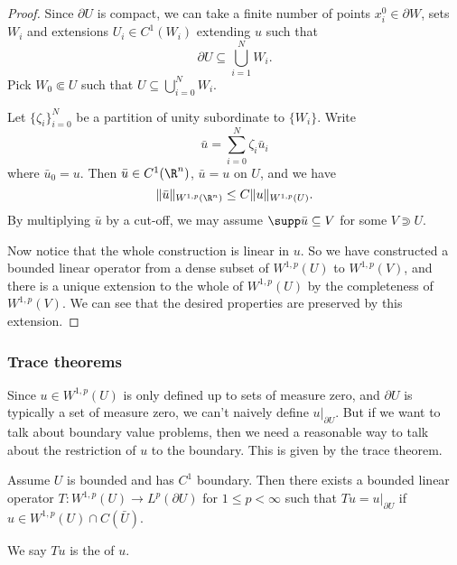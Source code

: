 \documentclass[a4paper]{article}
\begin{document}
\begin{proof}
  Since $\partial U$ is compact, we can take a finite number of points $x_i^0 \in \partial W$, sets $W_i$ and extensions $U_i \in C^1(W_i)$ extending $u$ such that
  \[
    \partial U \subseteq \bigcup_{i = 1}^N W_i.
  \]
  Pick $W_0 \Subset U$ such that $U \subseteq \bigcup_{i = 0}^N W_i$.

  Let $\{\zeta_i\}_{i = 0}^N$ be a partition of unity subordinate to $\{W_i\}$. Write
  \[
    \bar{u} = \sum_{i = 0}^N \zeta_i \bar{u}_i
  \]
  where $\bar{u}_0 = u$. Then $\bar{u} \in C^1(\R^n)$, $\bar{u} = u$ on $U$, and we have
  \[
    \|\bar{u}\|_{W^{1, p}(\R^n)} \leq C \|u\|_{W^{1, p}(U)}.
  \]
  By multiplying $\bar{u}$ by a cut-off, we may assume $\supp \bar{u} \subseteq V$ for some $V \Supset U$.

  Now notice that the whole construction is linear in $u$. So we have constructed a bounded linear operator from a dense subset of $W^{1, p}(U)$ to $W^{1,p}(V)$, and there is a unique extension to the whole of $W^{1, p}(U)$ by the completeness of $W^{1, p}(V)$. We can see that the desired properties are preserved by this extension.
\end{proof}

\subsubsection*{Trace theorems}
Since $u \in W^{1, p}(U)$ is only defined up to sets of measure zero, and $\partial U$ is typically a set of measure zero, we can't naively define $u|_{\partial U}$. But if we want to talk about boundary value problems, then we need a reasonable way to talk about the restriction of $u$ to the boundary. This is given by the trace theorem.

\begin{thm}
  Assume $U$ is bounded and has $C^1$ boundary. Then there exists a bounded linear operator $T: W^{1, p}(U) \to L^p(\partial U)$ for $1 \leq p < \infty$ such that $Tu = u|_{\partial U}$ if $u \in W^{1, p}(U) \cap C(\bar{U})$.
\end{thm}
We say $Tu$ is the  of $u$.
\end{document}
